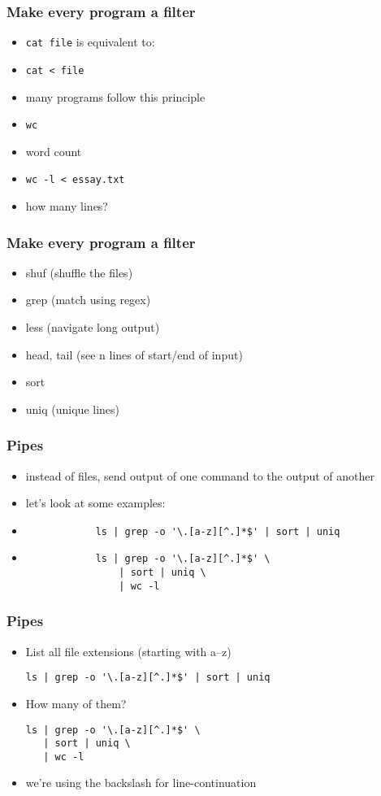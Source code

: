 \documentclass[%
        hyperref={%
                pdfauthor={Zakariyya Mughal},%
                pdfpagemode={None},pdfpagelayout={SinglePage}}%
        xcolor={x11names},%
]{beamer}
\begin{document}
\begin{frame}
	\frametitle{Make every program a filter}
	\begin{itemize}
		\item \texttt{cat file} is equivalent to:
		\item \texttt{cat < file}
		\item many programs follow this principle
		\pause\item \texttt{wc}
		\item word count
		\pause\item \texttt{wc -l < essay.txt}
		\item how many lines?
	\end{itemize}
\end{frame}
\begin{frame}
	\frametitle{Make every program a filter}
	\begin{itemize}
		\item shuf (shuffle the files)
		\item grep (match using regex)
		\item less (navigate long output)
		\item head, tail (see n lines of start/end of input)
		\item sort
		\item uniq (unique lines)
	\end{itemize}
\end{frame}
\begin{frame}[fragile]
	\frametitle{Pipes}
	\begin{itemize}
		\item instead of files, send output of one command
			to the output of another
		\item let's look at some examples:

		\item \begin{lstlisting}
			ls | grep -o '\.[a-z][^.]*$' | sort | uniq
			\end{lstlisting}
		\pause\item \begin{lstlisting}
			ls | grep -o '\.[a-z][^.]*$' \
				| sort | uniq \
				| wc -l
			\end{lstlisting}
	\end{itemize}
\end{frame}
\begin{frame}[fragile]
	\frametitle{Pipes}
	\begin{itemize}
		\item List all file extensions (starting with a--z)
\begin{lstlisting}
ls | grep -o '\.[a-z][^.]*$' | sort | uniq
\end{lstlisting}
		\pause\item How many of them?
\begin{lstlisting}
ls | grep -o '\.[a-z][^.]*$' \
   | sort | uniq \
   | wc -l
\end{lstlisting}
		\item we're using the backslash for line-continuation
	\end{itemize}
\end{frame}
\end{document}
